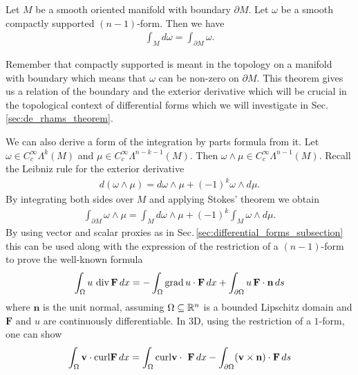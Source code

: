 \documentclass[../main.tex]{subfiles}
\begin{document}
\begin{theorem}[Stokes]
    Let $M$ be a smooth oriented manifold with boundary 
    $\partial M$. Let $\omega$ be 
    a smooth compactly supported $(n-1)$-form. Then we have 
    \begin{align*}
        \int_M d\omega = \int_{\partial M} \omega.
    \end{align*}
\end{theorem}
Remember that compactly supported is meant in the topology on a manifold with 
boundary which means that $\omega$ can be non-zero on $\partial M$.
This theorem gives us a relation of the boundary and the exterior derivative 
which will be crucial in the topological context of differential forms 
which we will investigate in Sec.\,\ref{sec:de_rhams_theorem}. 

We can also derive a form of the integration by parts formula from it. 
Let $\omega \in C_c^\infty \Lambda^k (M)$ and $\mu \in C_c^\infty \Lambda^{n-k-1}(M)$. 
Then $\omega \wedge \mu \in C_c^\infty \Lambda^{n-1} (M)$. Recall the 
Leibniz rule for the exterior derivative 
\begin{align*}
    d(\omega \wedge \mu) = d\omega \wedge \mu + (-1)^k \omega \wedge d\mu. 
\end{align*}
By integrating both sides over $M$ and applying Stokes' theorem we obtain
\begin{align*}
    \int_{\partial M} \omega \wedge \mu 
    = \int_M d\omega \wedge \mu + (-1)^k \int_M \omega \wedge d\mu.
\end{align*}
By using vector and scalar proxies as in Sec.\,\ref{sec:differential_forms_subsection}
this can be used along with the expression of the restriction of a $(n-1)$-form to 
prove the well-known formula
\begin{align*}
    \int_\Omega u\,\operatorname{div} \mathbf{F} \, dx 
    =  - \int_\Omega \operatorname{grad} u \cdot \mathbf{F} \, dx + 
        \int_{\partial \Omega } u \, \mathbf{F}\cdot \mathbf{n} \, ds
\end{align*}
where $\mathbf{n}$ is the unit normal, assuming $\Omega \subseteq \mathbb{R}^n$ is a bounded Lipschitz domain
and $\mathbf{F}$ and $u$ are continuously differentiable.
In 3D, using the restriction of a $1$-form, one can show
\begin{align*}
    \int_\Omega \mathbf{v} \cdot \mathbf{\operatorname{curl}} \mathbf{F} \, dx
    = \int_\Omega \mathbf{\operatorname{curl}} \mathbf{v} \cdot \ \mathbf{F} \, dx
        - \int_{\partial \Omega } (\mathbf{v} \times \mathbf{n})\cdot \mathbf{F} \, ds
\end{align*}
\end{document}
